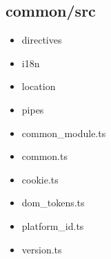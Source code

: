 \subsection{common/src}


\begin{itemize}
  \item directives
  \item i18n
  \item location
  \item pipes
\end{itemize}


\begin{itemize}
  \item common\_module.ts
  \item common.ts
  \item cookie.ts
  \item dom\_tokens.ts
  \item platform\_id.ts
  \item version.ts
\end{itemize}









